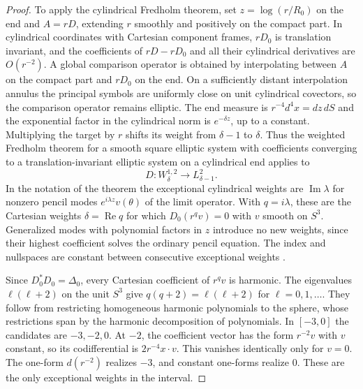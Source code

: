 \documentclass[11pt,letterpaper]{article}
\numberwithin{equation}{section}
\begin{document}
\begin{proof}
To apply the cylindrical Fredholm theorem, set \(z=\log(r/R_0)\) on
the end and \(A=rD\), extending \(r\) smoothly and positively on the
compact part. In cylindrical coordinates with Cartesian component
frames, \(rD_0\) is translation invariant, and the coefficients of
\(rD-rD_0\) and all their cylindrical derivatives are \(O(r^{-2})\).
A global comparison operator is obtained by interpolating between
\(A\) on the compact part and \(rD_0\) on the end. On a sufficiently
distant interpolation annulus the principal symbols are uniformly close
on unit cylindrical covectors, so the comparison operator remains
elliptic. The end measure is \(r^{-4}d^4x=dz\,dS\) and the exponential
factor in the cylindrical norm is \(e^{-\delta z}\), up to a constant.
Multiplying the target by \(r\) shifts its weight from \(\delta-1\)
to \(\delta\). Thus the weighted Fredholm theorem for a smooth square
elliptic system with coefficients converging to a translation-invariant
elliptic system on a cylindrical end applies to
\[
 D\colon W^{1,2}_\delta\longrightarrow L^2_{\delta-1}.
\]
In the notation of the theorem the exceptional cylindrical weights are
\(\operatorname{Im}\lambda\) for nonzero pencil modes
\(e^{i\lambda z}v(\theta)\) of the limit operator. With \(q=i\lambda\),
these are the Cartesian weights \(\delta=\operatorname{Re}q\) for
which \(D_0(r^qv)=0\) with \(v\) smooth on \(S^3\).
Generalized modes with polynomial factors in \(z\) introduce no new
weights, since their highest coefficient solves the ordinary pencil
equation. The index and nullspaces are constant between consecutive
exceptional weights
\cite[Theorem~6.2 and Lemma~7.1]{LockhartMcOwen1985Elliptic}.

Since \(D_0^*D_0=\Delta_0\), every Cartesian coefficient of
\(r^qv\) is harmonic. The eigenvalues \(\ell(\ell+2)\) on the unit
\(S^3\) give \(q(q+2)=\ell(\ell+2)\) for \(\ell=0,1,\ldots\).
They follow from restricting homogeneous harmonic polynomials to the
sphere, whose restrictions span by the harmonic decomposition of
polynomials. In \([-3,0]\) the candidates are \(-3,-2,0\).
At \(-2\), the coefficient vector has the form \(r^{-2}v\) with
\(v\) constant, so its codifferential is \(2r^{-4}x\cdot v\).
This vanishes identically only for \(v=0\).
The one-form \(d(r^{-2})\) realizes \(-3\), and constant one-forms
realize \(0\). These are the only exceptional weights in the interval.


\end{proof}
\end{document}
